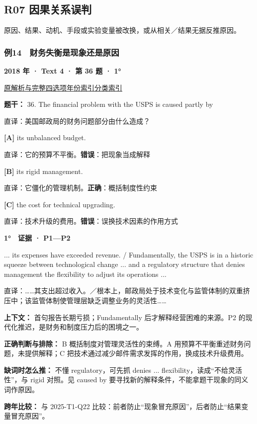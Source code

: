 \documentclass[11pt,a4paper]{article}
\begin{document}
\subsection{R07 因果关系误判}
原因、结果、动机、手段或实验变量被改换，或从相关／结果无据反推原因。

\subsubsection{例14　财务失衡是现象还是原因}\label{case-2018-T4-Q36}
\noindent\textbf{2018 年 · Text 4 · 第 36 题 · 1°}\par\noindent \href{https://zj139.github.io/math-notes/english/1dafc7c55c9104451a24cdf8/\#q36}{原解析与完整四选项}\quad \hyperref[idx-2018-T4-Q36]{年份索引}\quad \hyperref[class-R07]{分类索引}\par\smallskip
\noindent\textbf{题干：} 36. The financial problem with the USPS is caused partly by\par\smallskip
直译：美国邮政局的财务问题部分由什么造成？

\noindent\textbf{[A]} its unbalanced budget.\par\nopagebreak
\noindent 直译：它的预算不平衡。\quad\textbf{错误}：把现象当成解释\par\smallskip
{}\noindent\textbf{[B]} its rigid management.\par\nopagebreak
\noindent 直译：它僵化的管理机制。\quad\textbf{正确}：概括制度性约束\par\smallskip
{}\noindent\textbf{[C]} the cost for technical upgrading.\par\nopagebreak
\noindent 直译：技术升级的费用。\quad\textbf{错误}：误换技术因素的作用方式\par\smallskip
\begin{evidence}\textbf{1°　证据 · P1—P2}\par ... its expenses have exceeded revenue. / Fundamentally, the USPS is in a historic squeeze between technological change ... and a regulatory structure that denies management the flexibility to adjust its operations ...\par 直译：……其支出超过收入。／根本上，邮政局处于技术变化与监管体制的双重挤压中；该监管体制使管理层缺乏调整业务的灵活性……\end{evidence}
\noindent\textbf{上下文：} 首句报告长期亏损；Fundamentally 后才解释经营困难的来源。P2 的现代化推迟，是财务和制度压力后的困境之一。\par\smallskip
\noindent\textbf{正确判断与排除：} B 概括制度对管理灵活性的束缚。A 用预算不平衡重述财务问题，未提供解释；C 把技术通过减少邮件需求发挥的作用，换成技术升级费用。\par\smallskip
\noindent\textbf{缺词时怎么推：} 不懂 regulatory，可先抓 denies ... flexibility，读成“不给灵活性”，与 rigid 对照。见 caused by 要寻找新的解释条件，不能拿题干现象的同义词作原因。\par\smallskip
\noindent\textbf{跨年比较：} 与 2025-T1-Q22 比较：前者防止“现象冒充原因”，后者防止“结果变量冒充原因”。\par\smallskip
\clearpage
\end{document}
